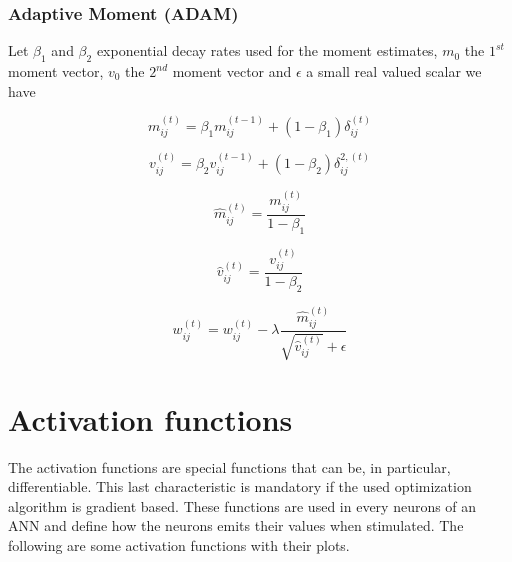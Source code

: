 \subsubsection*{Adaptive Moment (ADAM)}
Let $\beta_1$ and $\beta_2$ exponential decay rates used for the moment estimates, $m_0$ the $1^{st}$ moment vector, $v_0$ the $2^{nd}$ moment vector and $\epsilon$ a small real valued scalar we have 
\begin{center}
	\begin{equation}
		m_{ij}^{(t)} = \beta_1m_{ij}^{(t-1)} + (1 - \beta_1)\delta_{ij}^{(t)}
	\end{equation}
\end{center}

\begin{center}
	\begin{equation}
		v_{ij}^{(t)} = \beta_2v_{ij}^{(t-1)} + (1 - \beta_2)\delta_{ij}^{2,  (t)}
	\end{equation}
\end{center}

\begin{center}
	\begin{equation}
		\hat{m}_{ij}^{(t)} = \frac{m_{ij}^{(t)}}{1 - \beta_{1}}
	\end{equation}
\end{center}

\begin{center}
	\begin{equation}
		\hat{v}_{ij}^{(t)} = \frac{v_{ij}^{(t)}}{1 - \beta_{2}}
	\end{equation}
\end{center}

\begin{center}
	\begin{equation}
		w_{ij}^{(t)} = w_{ij}^{(t)} - \lambda\frac{\hat{m}_{ij}^{(t)}}{\sqrt{\hat{v}_{ij}^{(t)}} + \epsilon}
	\end{equation}
\end{center}


\section{Activation functions}
The activation functions are special functions that can be, in particular, differentiable. This last characteristic is mandatory if the used optimization algorithm is gradient based. These functions are used in every neurons of an ANN and define how the neurons emits their values when stimulated. The following are some activation functions with their plots.

